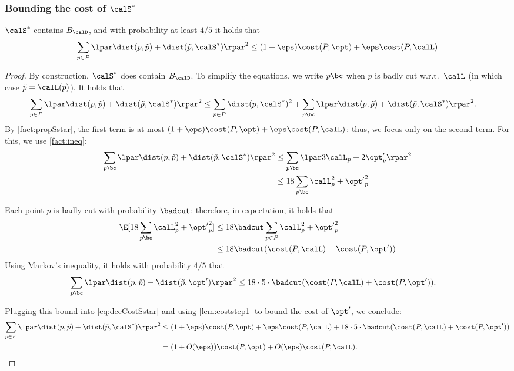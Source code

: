 \subsubsection{Bounding the cost of $\calS^*$}

\begin{lemma}
  \label{prop:structkmeans}
  $ \calS^*$ contains $B_{\calD}$, and with probability at least $4/5$ it holds that 
  \[\sum_{p \in P} \lpar \dist(p, \tilde p) + \dist(\tilde p,  \calS^*)\rpar^2 \leq (1+\eps)\cost(P, \opt) + \eps \cost(P, \calL)\]
\end{lemma}
\begin{proof}
By construction, $ \calS^*$ does contain $B_\calD$.
To simplify the equations, we write $p \bc$ when $p$ is badly cut w.r.t.\ $\calL$ (in which case $\tilde p = \calL(p)$). It holds that 
\begin{align}
\label{eq:decCostSstar}
    \sum_{p \in P} \lpar \dist(p, \tilde p) + \dist(\tilde p,  \calS^*)\rpar^2 &\leq \sum_{p \in P} \dist( p,  \calS^*)^2 + \sum_{p \bc} \lpar \dist(p, \tilde p) + \dist(\tilde p,  \calS^*)\rpar^2.
\end{align}
By \cref{fact:propSstar}, the first term is at most $(1+\eps)\cost(P, \opt) + \eps \cost(P, \calL)$: thus, we focus only on the second term.
For this, we use \cref{fact:ineq}:
\begin{align*}
    \sum_{p \bc} \lpar \dist(p, \tilde p) + \dist(\tilde p,  \calS^*)\rpar^2 & \leq \sum_{p \bc} \lpar 3\calL_p + 2\opt'_p\rpar^2\\
    &\leq 18\sum_{p \bc}  \calL_p^2 + {\opt'}_p^2
\end{align*}

Each point $p$ is badly cut with probability $\badcut$: therefore, in expectation, it holds that 
\begin{align*}
    \E[18\sum_{p \bc}   \calL_p^2 + {\opt'}_p^2] &\leq 18 \badcut \sum_{p \in P}  \calL_p^2 + {\opt'}_p^2\\
    &\leq 18\badcut (\cost(P, \calL) + \cost(P,  \opt'))
\end{align*}
Using Markov's inequality, it holds with probability $4/5$ that 
\begin{align*}
    \sum_{p \bc} \lpar \dist(p, \tilde p) + \dist(\tilde p,  \opt')\rpar^2 &\leq 18\cdot 5 \cdot \badcut (\cost(P, \calL) + \cost(P,  \opt')).
\end{align*}

Plugging this bound into \cref{eq:decCostSstar} and using \cref{lem:coststep1} to bound the cost of $\opt'$, we conclude:
\begin{align*}
    \sum_{p \in P} \lpar \dist(p, \tilde p) + \dist(\tilde p,  \calS^*)\rpar^2 &\leq (1+\eps)\cost(P, \opt) + \eps \cost(P, \calL)  + 18\cdot 5 \cdot \badcut (\cost(P, \calL) + \cost(P,  \opt')) \\
    &= (1+O(\eps))\cost(P, \opt) + O(\eps)\cost(P, \calL).\qedhere
\end{align*}
\end{proof}


